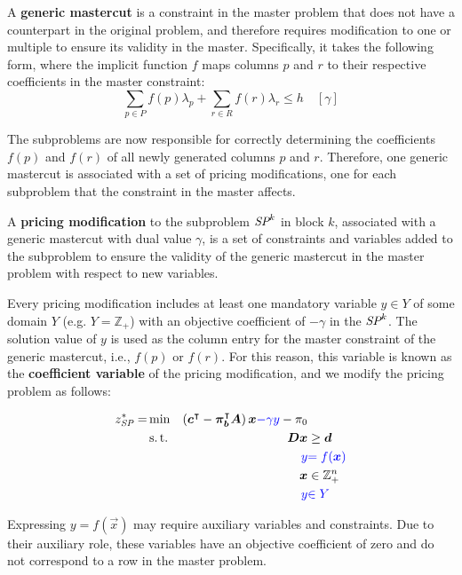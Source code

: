 \begin{definition}\label{def:gm}
A \textbf{generic mastercut} is a constraint in the master problem that does not have a counterpart in the original problem, and therefore requires modification to one or multiple \SP{} to ensure its validity in the master. Specifically, it takes the following form, where the implicit function $f$ maps columns $p$ and $r$ to their respective coefficients in the master constraint:
\begin{equation*}
\sum_{p \in P} f(p) \lambda_p + \sum_{r \in R} f(r) \lambda_r \leq h \quad \left[\gamma\right]
\end{equation*}

The subproblems are now responsible for correctly determining the coefficients $f(p)$ and $f(r)$ of all newly generated columns $p$ and $r$. Therefore, one generic mastercut is associated with a set of pricing modifications, one for each subproblem that the constraint in the master affects.
\end{definition}

\begin{definition}\label{def:gm_pricing_modification}
A \textbf{pricing modification} to the subproblem $\SP{k}$ in block $k$, associated with a generic mastercut with dual value $\gamma$, is a set of constraints and variables added to the subproblem to ensure the validity of the generic mastercut in the master problem with respect to new variables.

Every pricing modification includes at least one mandatory variable $y \in Y$ of some domain $Y$ (e.g. $Y = \mathbb{Z}_+$) with an objective coefficient of $-\gamma$ in the $\SP{k}$. The solution value of $y$ is used as the column entry for the master constraint of the generic mastercut, i.e., $f(p)$ or $f(r)$. For this reason, this variable is known as the \textbf{coefficient variable} of the pricing modification, and we modify the pricing problem as follows:

\begin{equation*}
\begin{aligned}
z^*_\SP{} = &\min & \left( \vec{c}\transpose - \vec{\pi}_\vec{b}\transpose \mat{A} \right) \vec{x} {\color{blue} - \gamma y} - \pi_0 & \\
&\st & \mat{D} \vec{x} & \geq \vec{d} \\
&& {\color{blue} y} & {\color{blue} = f(\vec{x})} \\
&& \vec{x} & \in \mathbb{Z}_+^n \\
&& {\color{blue} y} & {\color{blue} \in Y}
\end{aligned}
\end{equation*}

Expressing $y = f(\vec{x})$ may require auxiliary variables and constraints. Due to their auxiliary role, these variables have an objective coefficient of zero and do not correspond to a row in the master problem.
\end{definition}


